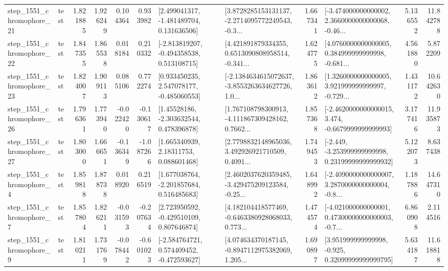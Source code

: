 \begin{tabular}{llrrrrllrlrr}
 step\_1551\_chromophore\_21 &      test &      1.821885 &    1.926249 &      0.104364 &  0.933982 &    [2.499041317, -1.481489704, 0.131636506] &  [3.8728285153131137, -2.2714095772249543, -0.3... &       1.667341 &  [-3.474000000000002, 2.3660000000000068, -0.46... &            5.136552 &         11.842788 \\
 step\_1551\_chromophore\_22 &      test &      1.847355 &    1.865538 &      0.018184 &  0.210332 &   [-2.813819207, -0.494358538, 0.513108715] &  [4.421891879334355, 0.6513090808958514, -0.341... &       1.624775 &  [4.0760000000000005, 0.384999999999998, -0.681... &            4.561880 &          5.872209 \\
 step\_1551\_chromophore\_23 &      test &      1.824007 &    1.909113 &      0.085106 &  0.772274 &    [0.933450235, 2.547078177, -0.485060553] &  [-2.1384634615072637, -3.8553263634627726, 1.0... &       1.863612 &  [1.3260000000000005, 3.921999999999997, -0.729... &            1.431172 &         10.642630 \\
 step\_1551\_chromophore\_26 &      test &      1.796361 &    1.773940 &     -0.022420 & -0.130617 &     [1.45528186, -2.303632544, 0.478396878] &  [1.767108798300913, -4.111867309428162, 0.7662... &       1.857368 &  [-2.4620000000000015, 3.474, -0.6679999999999993] &            3.177416 &         11.935873 \\
 step\_1551\_chromophore\_27 &      test &      1.803000 &    1.666651 &     -0.136349 & -1.087266 &      [1.665340939, 2.18311753, 0.088601468] &  [2.7798832148965036, 3.492926921710509, 0.4091... &       1.749453 &  [-2.449, -3.253999999999998, 0.23199999999999932] &            5.122073 &          8.637438 \\
  step\_1551\_chromophore\_4 &      test &      1.859818 &    1.878738 &      0.018920 &  0.216519 &    [1.677038764, -2.201857684, 0.516485683] &  [2.4602037620359485, -3.429475209123584, -0.25... &       1.648992 &  [-2.4090000000000007, 3.2870000000000004, -0.8... &            1.187886 &         14.647310 \\
  step\_1551\_chromophore\_7 &      test &      1.857804 &    1.826211 &     -0.031593 & -0.207634 &    [2.723950592, -0.429510109, 0.807646874] &  [4.182104418577469, -0.6463380928068033, 0.773... &       1.474574 &  [-4.021000000000001, 0.47300000000000003, -0.7... &            6.860908 &          2.114516 \\
  step\_1551\_chromophore\_9 &      test &      1.810211 &    1.731769 &     -0.078442 & -0.601023 &   [-2.584764721, 0.574409452, -0.472593627] &  [4.074634370187145, -0.8947112975382069, 1.205... &       1.690897 &   [3.951999999999998, -0.925, 0.32099999999999795] &            5.634187 &         11.618818 \\

\end{tabular}
